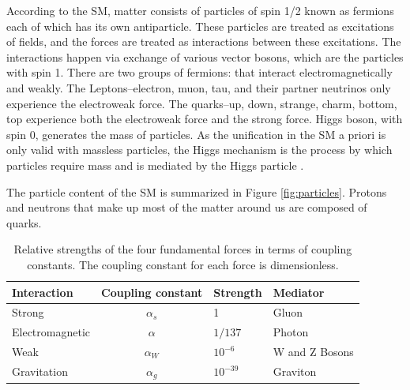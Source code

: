 According to the SM, matter consists of particles of spin 1/2 known as fermions each of which has its own antiparticle. These particles are treated as excitations of fields, and the forces are treated as interactions between these excitations. The interactions happen via exchange of various vector bosons, which are the particles with spin 1. There are two groups of fermions: that interact electromagnetically and weakly. The Leptons--electron, muon, tau, and their partner neutrinos only experience the electroweak force. The quarks--up, down, strange, charm, bottom, top experience both the electroweak force and the strong force. Higgs boson, with spin 0, generates the mass of particles. As the unification in the SM a priori is only valid with massless particles, the Higgs mechanism is the process by which particles require mass \cite{Weinberg:1967,Salam:1968} and is mediated by the Higgs particle \cite{PhysRevLett.13.321, PhysRevLett.13.508}. 


The particle content of the SM is summarized in Figure \ref{fig:particles}. Protons and neutrons that make up most of the matter around us are composed of quarks.  

\begin{table}
\begin{center}
     \caption{Relative strengths of the four fundamental forces in terms of coupling constants. The coupling constant for each force is dimensionless.}

    \begin{tabular}{| l | c | l | l |}
    \hline
    {\bf Interaction} &  {\bf Coupling constant} & {\bf Strength} & {\bf Mediator} \\ \hline
    Strong & $\alpha_{s}$& 1  & Gluon \\ \hline
    Electromagnetic &$ \alpha $&  $1/137$  & Photon \\ \hline
    Weak & $\alpha_{W}$ &$10^{-6}$ &   W and Z Bosons\\ \hline
    Gravitation & $\alpha_{g}$ &$10^{-39}$  & Graviton \\
    \hline
    \end{tabular}
    \captionsetup{format=hang}    

\end{center}
\end{table}



